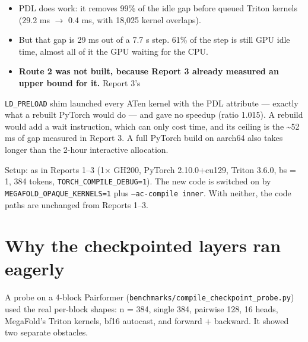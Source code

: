 \documentclass[10pt]{article}
\begin{document}
\begin{itemize}
\item PDL does work: it removes 99\% of the idle gap before queued Triton kernels (29.2 ms $\rightarrow$ 0.4 ms, with 18,025 kernel overlaps).
\item But that gap is 29 ms out of a 7.7 s step. 61\% of the step is still GPU idle time, almost all of it the GPU waiting for the CPU.
\item \textbf{Route 2 was not built, because Report 3 already measured an upper bound for it.} Report 3's
\end{itemize}
\texttt{LD\_PRELOAD} shim launched every ATen kernel with the PDL attribute --- exactly what a rebuilt PyTorch would do --- and gave no speedup (ratio 1.015). A rebuild would add a wait instruction, which can only cost time, and its ceiling is the \textasciitilde{}52 ms of gap measured in Report 3. A full PyTorch build on aarch64 also takes longer than the 2-hour interactive allocation.


Setup: as in Reports 1--3 (1$\times$ GH200, PyTorch 2.10.0+cu129, Triton 3.6.0, bs = 1, 384 tokens, \texttt{TORCH\_COMPILE\_DEBUG=1}). The new code is switched on by \texttt{MEGAFOLD\_OPAQUE\_KERNELS=1} plus \texttt{--ac-compile inner}. With neither, the code paths are unchanged from Reports 1--3.



\section{Why the checkpointed layers ran eagerly}

A probe on a 4-block Pairformer (\texttt{benchmarks/compile\_checkpoint\_probe.py}) used the real per-block shapes: n = 384, single 384, pairwise 128, 16 heads, MegaFold's Triton kernels, bf16 autocast, and forward + backward. It showed two separate obstacles.
\end{document}
